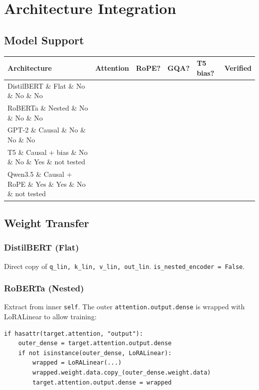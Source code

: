 
\section{Architecture Integration}

\subsection{Model Support}

\begin{table}[H]
\centering
\small
\begin{tabular}{llllll}
\toprule
\textbf{Architecture} & \textbf{Attention} & \textbf{RoPE?} & \textbf{GQA?} & \textbf{T5 bias?} & \textbf{Verified} \\
\midrule
DistilBERT \& Flat \& No \& No \& No &  \\
RoBERTa \& Nested \& No \& No \& No &  \\
GPT-2 \& Causal \& No \& No \& No &  \\
T5 \& Causal + bias \& No \& No \& Yes \& not tested \\
Qwen3.5 \& Causal + RoPE \& Yes \& Yes \& No \& not tested \\
\bottomrule
\end{tabular}
\end{table}

\subsection{Weight Transfer}

\subsubsection{DistilBERT (Flat)}

Direct copy of \texttt{q\_lin, k\_lin, v\_lin, out\_lin}. \texttt{is\_nested\_encoder = False}.

\subsubsection{RoBERTa (Nested)}

Extract from inner \texttt{self}. The outer \texttt{attention.output.dense} is wrapped 
with LoRALinear to allow training:

\begin{lstlisting}
if hasattr(target.attention, "output"):
    outer_dense = target.attention.output.dense
    if not isinstance(outer_dense, LoRALinear):
        wrapped = LoRALinear(...)
        wrapped.weight.data.copy_(outer_dense.weight.data)
        target.attention.output.dense = wrapped
\end{lstlisting}

